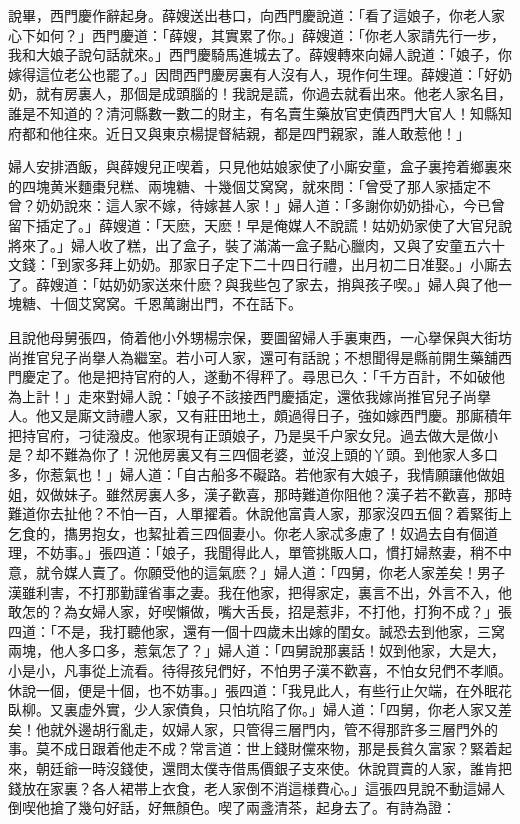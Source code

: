 說畢，西門慶作辭起身。薛嫂送出巷口，向西門慶說道：「看了這娘子，你老人家心下如何？」西門慶道：「薛嫂，其實累了你。」薛嫂道：「你老人家請先行一步，我和大娘子說句話就來。」西門慶騎馬進城去了。薛嫂轉來向婦人說道：「娘子，你嫁得這位老公也罷了。」因問西門慶房裏有人沒有人，現作何生理。薛嫂道：「好奶奶，就有房裏人，那個是成頭腦的！我說是謊，你過去就看出來。他老人家名目，誰是不知道的？清河縣數一數二的財主，有名賣生藥放官吏債西門大官人！知縣知府都和他往來。近日又與東京楊提督結親，都是四門親家，誰人敢惹他！」

婦人安排酒飯，與薛嫂兒正喫着，只見他姑娘家使了小廝安童，盒子裏挎着鄉裏來的四塊黄米麵棗兒糕、兩塊糖、十幾個艾窝窝，就來問：「曾受了那人家插定不曾？奶奶說來：這人家不嫁，待嫁甚人家！」婦人道：「多謝你奶奶掛心，今已曾留下插定了。」薛嫂道：「天麽，天麽！早是俺媒人不說謊！姑奶奶家使了大官兒說將來了。」婦人收了糕，出了盒子，裝了滿滿一盒子點心臘肉，又與了安童五六十文錢：「到家多拜上奶奶。那家日子定下二十四日行禮，出月初二日准娶。」小廝去了。薛嫂道：「姑奶奶家送來什麽？與我些包了家去，捎與孩子喫。」婦人與了他一塊糖、十個艾窝窝。千恩萬謝出門，不在話下。

且說他母舅張四，倚着他小外甥楊宗保，要圖留婦人手裏東西，一心擧保與大街坊尚推官兒子尚擧人為繼室。若小可人家，還可有話說；不想聞得是縣前開生藥舖西門慶定了。他是把持官府的人，遂動不得秤了。尋思已久：「千方百計，不如破他為上計！」走來對婦人說：「娘子不該接西門慶插定，還依我嫁尚推官兒子尚擧人。他又是廝文詩禮人家，又有莊田地土，頗過得日子，強如嫁西門慶。那廝積年把持官府，刁徒潑皮。他家現有正頭娘子，乃是吳千户家女兒。過去做大是做小是？却不難為你了！況他房裏又有三四個老婆，並沒上頭的丫頭。到他家人多口多，你惹氣也！」婦人道：「自古船多不礙路。若他家有大娘子，我情願讓他做姐姐，奴做妹子。雖然房裏人多，漢子歡喜，那時難道你阻他？漢子若不歡喜，那時難道你去扯他？不怕一百，人單擢着。休說他富貴人家，那家沒四五個？着緊街上乞食的，㩦男抱女，也絜扯着三四個妻小。你老人家忒多慮了！奴過去自有個道理，不妨事。」張四道：「娘子，我聞得此人，單管挑販人口，慣打婦熬妻，稍不中意，就令媒人賣了。你願受他的這氣麽？」婦人道：「四舅，你老人家差矣！男子漢雖利害，不打那勤謹省事之妻。我在他家，把得家定，裏言不出，外言不入，他敢怎的？為女婦人家，好喫懶做，嘴大舌長，招是惹非，不打他，打狗不成？」張四道：「不是，我打聽他家，還有一個十四歲未出嫁的閨女。誠恐去到他家，三窝兩塊，他人多口多，惹氣怎了？」婦人道：「四舅說那裏話！奴到他家，大是大，小是小，凡事從上流看。待得孩兒們好，不怕男子漢不歡喜，不怕女兒們不孝順。休說一個，便是十個，也不妨事。」張四道：「我見此人，有些行止欠端，在外眠花臥柳。又裏虚外實，少人家債負，只怕坑陷了你。」婦人道：「四舅，你老人家又差矣！他就外邊胡行亂走，奴婦人家，只管得三層門内，管不得那許多三層門外的事。莫不成日跟着他走不成？常言道：世上錢財儻來物，那是長貧久富家？緊着起來，朝廷爺一時沒錢使，還問太僕寺借馬價銀子支來使。休說買賣的人家，誰肯把錢放在家裏？各人裙帯上衣食，老人家倒不消這様費心。」這張四見說不動這婦人倒喫他搶了幾句好話，好無顏色。喫了兩盞清茶，起身去了。有詩為證：


